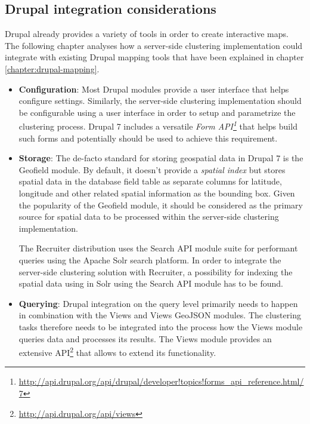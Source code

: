\subsection{Drupal integration considerations}
\label{chapter:analysis-drupal}

Drupal already provides a variety of tools in order to create interactive maps. The following chapter analyses how a server-side clustering implementation could integrate with existing Drupal mapping tools that have been explained in chapter \ref{chapter:drupal-mapping}.

\begin{itemize}

\item \textbf{Configuration}: Most Drupal modules provide a user interface that helps configure settings. Similarly, the server-side clustering implementation should be configurable using a user interface in order to setup and parametrize the clustering process. Drupal 7 includes a versatile \textit{Form API\footnote{\url{http://api.drupal.org/api/drupal/developer!topics!forms_api_reference.html/7}}} that helps build such forms and potentially should be used to achieve this requirement.

\item \textbf{Storage}: The de-facto standard for storing geospatial data in Drupal 7 is the Geofield module. By default, it doesn't provide a \textit{spatial index} but stores spatial data in the database field table as separate columns for latitude, longitude and other related spatial information as the bounding box. Given the popularity of the Geofield module, it should be considered as the primary source for spatial data to be processed within the server-side clustering implementation.

The Recruiter distribution uses the Search API module suite for performant queries using the Apache Solr search platform. In order to integrate the server-side clustering solution with Recruiter, a possibility for indexing the spatial data using in Solr using the Search API module has to be found.

\item \textbf{Querying}: Drupal integration on the query level primarily needs to happen in combination with the Views and Views GeoJSON modules. The clustering tasks therefore needs to be integrated into the process how the Views module queries data and processes its results. The Views module provides an extensive API\footnote{\url{http://api.drupal.org/api/views}} that allows to extend its functionality.


\end{itemize}

